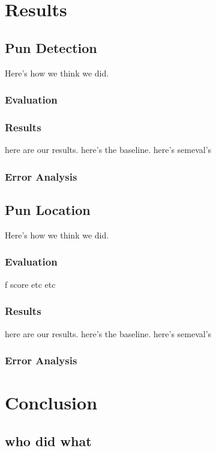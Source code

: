 \documentclass{article}
\begin{document}
\section{Results}
\label{results}

\subsection{Pun Detection}
Here's how we think we did.
\subsubsection{Evaluation}
\subsubsection{Results}
here are our results. here's the baseline. here's semeval's

\subsubsection{Error Analysis}

\subsection{Pun Location}
Here's how we think we did.
\subsubsection{Evaluation}
f score etc etc
\subsubsection{Results}
here are our results. here's the baseline. here's semeval's
\subsubsection{Error Analysis}


\section{Conclusion}
\label{conclusion}

\subsection{who did what}
\end{document}
